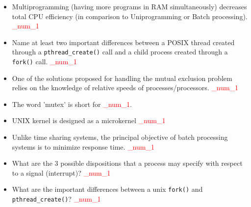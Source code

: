 \documentclass[9pt,landscape]{memoir}
\newcommand{\answer}[1]{\textcolor{red}{_num_1}}
\begin{document}
\begin{multicols}{6}
\begin{itemize}
    \item Multiprogramming (having more programs in RAM simultaneously) decreases total CPU efficiency (in comparison to Uniprogramming or Batch processing). \answer{FALSE. It increases CPU efficiency (see question above)}
    \item Name at least two important differences between a POSIX thread created through a \verb$pthread_create()$ call and a child process created through a \verb$fork()$ call.  \answer{1) Threads share data space and file descriptors with the other threads and the parent process while forked process doesn't 2) a forked process has a separate and unique PID and hence a process control block (PCB) while the threads created by a process uses their parent's PCB. 3) it takes less time to create a new thread, less time to switch between two threads within the same process, less time to terminate a thread 4) Thread Library provides more control over the execution of concurrent threads through system calls such as \texttt{pthread\_yield()}, \texttt{pthread\_suspend()}, \texttt{pthread\_kill()}, and \texttt{pthread\_continue()}}
    \item One of the solutions proposed for handling the mutual exclusion problem relies on the knowledge of relative speeds of processes/processors. \answer{False. No solution should rely on such assumptions}
    \item The word 'mutex' is short for \answer{mutual exclusion}.
    \item UNIX kernel is designed as a microkernel \answer{False. UNIX is a monolithic kernel, meaning that the process, memory, device, and file managers are all implemented in a single software module.}
    \item Unlike time sharing systems, the principal objective of batch processing systems is to minimize response time. \answer{False. Principal objective for time sharing is to minimize response time. Whereas, the principal objective for batch processing is to maximize processor use.}
    \item What are the 3 possible dispositions that a process may specify with respect to a signal (interrupt)? \answer{1) ignore signal; 2) run the default signal handler provided by the OS; 3) catch the signal and run the user's signal handler.}
    \item What are the important differences between a unix \verb$fork()$ and \verb$pthread_create()$? \answer{\texttt{fork()}: child process has the separate data space with parent process, but they have the same code space. \texttt{pthread\_create()}: threads share data space, code space, and os resources, but they have the unique thread ID, register state, stack and priority, PC counter.}

\end{itemize}
\end{multicols}
\end{document}
